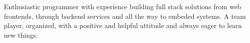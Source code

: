 
\begin{cventries}

\cventry
{}{}{}{}
{
	Enthusiastic programmer with experience building full stack solutions from web frontends, through backend services and all the way to embeded systems. 
	\newline A team player, organized, with a positive and helpful attitude and always eager to learn new things.
}

\end{cventries}
